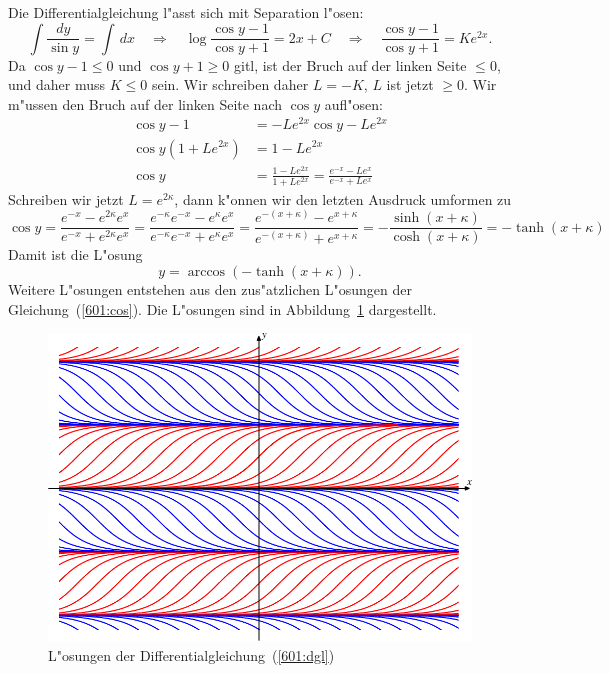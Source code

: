 \begin{diskussion}
Die Differentialgleichung l"asst sich mit Separation l"osen:
\[
\int \frac{dy}{\sin y}
=
\int\,dx
\quad\Rightarrow\quad
\log\frac{\cos y-1}{\cos y+1}
=
2x+C
\quad\Rightarrow\quad
\frac{\cos y-1}{\cos y+1}
=
Ke^{2x}.
\]
Da $\cos y-1\le 0$ und $\cos y +1\ge 0$ gitl, ist der Bruch auf der linken
Seite $\le 0$, und daher muss $K\le 0$ sein.
Wir schreiben daher $L=-K$, $L$ ist jetzt $\ge 0$.
Wir m"ussen den Bruch auf der linken Seite nach $\cos y$ aufl"osen:
\begin{align*}
\cos y - 1 &=-Le^{2x}\cos y -Le^{2x}
\\
\cos y(1+Le^{2x})
&=
1-Le^{2x}
\\
\cos y
&=
\frac{1-Le^{2x}}{1+Le^{2x}}
=
\frac{e^{-x}-Le^{x}}{e^{-x}+Le^x}
\end{align*}
Schreiben wir jetzt $L=e^{2\kappa}$, dann k"onnen wir den letzten
Ausdruck umformen zu
\begin{equation}
\cos y
=
\frac{e^{-x}-e^{2\kappa}e^x}{e^{-x}+e^{2\kappa}e^x}
=
\frac{e^{-\kappa}e^{-x}-e^{\kappa}e^x}{e^{-\kappa}e^{-x}+e^{\kappa}e^x}
=
\frac{e^{-(x+\kappa)}-e^{x+\kappa}}{e^{-(x+\kappa)}+e^{x + \kappa}}
=
-\frac{\sinh(x+\kappa)}{\cosh(x+\kappa)}
=
-\tanh(x+\kappa)
\label{601:cos}
\end{equation}
Damit ist die L"osung
\[
y=\arccos(-\tanh(x+\kappa)).
\]
Weitere L"osungen entstehen aus den zus"atzlichen L"osungen der
Gleichung~(\ref{601:cos}).
Die L"osungen sind in Abbildung~\ref{601:bild} dargestellt.
\begin{figure}
\centering
\includegraphics{uebungsaufgaben/601-1.pdf}
\caption{L"osungen der Differentialgleichung~(\ref{601:dgl})
\label{601:bild}}
\end{figure}
\end{diskussion}

